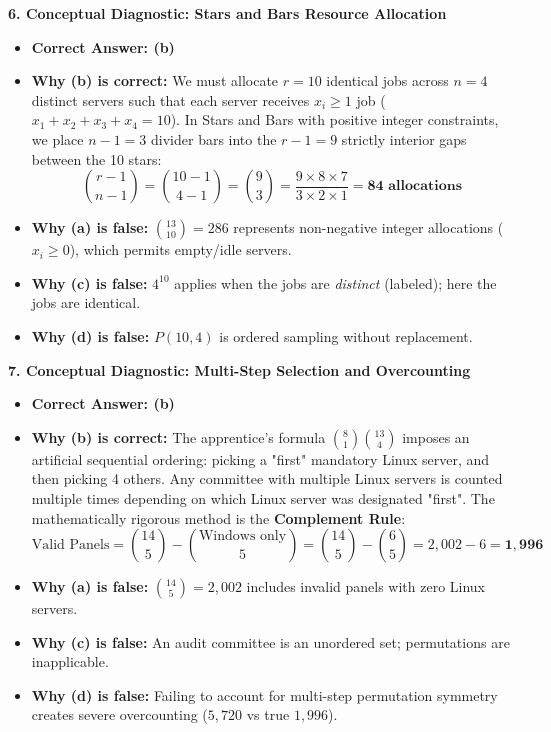 \textbf{6. Conceptual Diagnostic: Stars and Bars Resource Allocation}
\begin{itemize}
    \item \textbf{Correct Answer: (b)}
    \item \textbf{Why (b) is correct:} We must allocate $r = 10$ identical jobs across $n = 4$ distinct servers such that each server receives $x_i \ge 1$ job ($x_1 + x_2 + x_3 + x_4 = 10$). In Stars and Bars with positive integer constraints, we place $n - 1 = 3$ divider bars into the $r - 1 = 9$ strictly interior gaps between the 10 stars:
    $$\binom{r - 1}{n - 1} = \binom{10 - 1}{4 - 1} = \binom{9}{3} = \frac{9 \times 8 \times 7}{3 \times 2 \times 1} = \mathbf{84 \text{ allocations}}$$
    \item \textbf{Why (a) is false:} $\binom{13}{10} = 286$ represents non-negative integer allocations ($x_i \ge 0$), which permits empty/idle servers.
    \item \textbf{Why (c) is false:} $4^{10}$ applies when the jobs are \emph{distinct} (labeled); here the jobs are identical.
    \item \textbf{Why (d) is false:} $P(10, 4)$ is ordered sampling without replacement.
\end{itemize}

\textbf{7. Conceptual Diagnostic: Multi-Step Selection and Overcounting}
\begin{itemize}
    \item \textbf{Correct Answer: (b)}
    \item \textbf{Why (b) is correct:} The apprentice's formula $\binom{8}{1}\binom{13}{4}$ imposes an artificial sequential ordering: picking a "first" mandatory Linux server, and then picking 4 others. Any committee with multiple Linux servers is counted multiple times depending on which Linux server was designated "first". The mathematically rigorous method is the \textbf{Complement Rule}:
    $$\text{Valid Panels} = \binom{14}{5} - \binom{\text{Windows only}}{5} = \binom{14}{5} - \binom{6}{5} = 2{,}002 - 6 = \mathbf{1{,}996}$$
    \item \textbf{Why (a) is false:} $\binom{14}{5} = 2{,}002$ includes invalid panels with zero Linux servers.
    \item \textbf{Why (c) is false:} An audit committee is an unordered set; permutations are inapplicable.
    \item \textbf{Why (d) is false:} Failing to account for multi-step permutation symmetry creates severe overcounting ($5{,}720$ vs true $1{,}996$).
\end{itemize}


